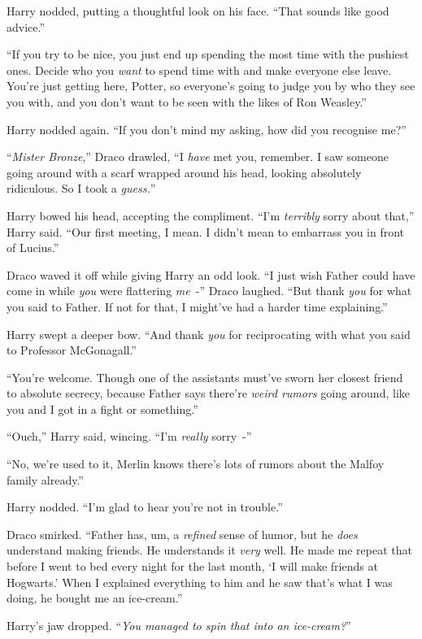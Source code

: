 Harry nodded, putting a thoughtful look on his face. ``That sounds like good advice.''

``If you try to be nice, you just end up spending the most time with the pushiest ones. Decide who you \emph{want} to spend time with and make everyone else leave. You're just getting here, Potter, so everyone's going to judge you by who they see you with, and you don't want to be seen with the likes of Ron Weasley.''

Harry nodded again. ``If you don't mind my asking, how did you recognise me?''

``\emph{Mister Bronze},'' Draco drawled, ``I \emph{have} met you, remember. I saw someone going around with a scarf wrapped around his head, looking absolutely ridiculous. So I took a \emph{guess.}''

Harry bowed his head, accepting the compliment. ``I'm \emph{terribly} sorry about that,'' Harry said. ``Our first meeting, I mean. I didn't mean to embarrass you in front of Lucius.''

Draco waved it off while giving Harry an odd look. ``I just wish Father could have come in while \emph{you} were flattering \emph{me}~-'' Draco laughed. ``But thank \emph{you} for what you said to Father. If not for that, I might've had a harder time explaining.''

Harry swept a deeper bow. ``And thank \emph{you} for reciprocating with what you said to Professor McGonagall.''

``You're welcome. Though one of the assistants must've sworn her closest friend to absolute secrecy, because Father says there're \emph{weird rumors} going around, like you and I got in a fight or something.''

``Ouch,'' Harry said, wincing. ``I'm \emph{really} sorry~-''

``No, we're used to it, Merlin knows there's lots of rumors about the Malfoy family already.''

Harry nodded. ``I'm glad to hear you're not in trouble.''

Draco smirked. ``Father has, um, a \emph{refined} sense of humor, but he \emph{does} understand making friends. He understands it \emph{very} well. He made me repeat that before I went to bed every night for the last month, `I will make friends at Hogwarts.' When I explained everything to him and he saw that's what I was doing, he bought me an ice-cream.''

Harry's jaw dropped. ``\emph{You managed to spin that into an ice-cream?}''

